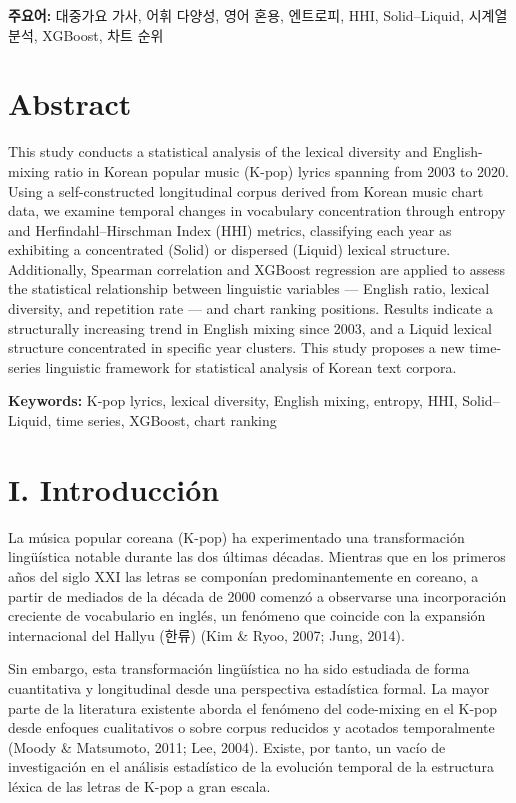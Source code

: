 \documentclass[11pt,a4paper]{article}
\begin{document}
\textbf{주요어:} 대중가요 가사, 어휘 다양성, 영어 혼용, 엔트로피, HHI,
Solid--Liquid, 시계열 분석, XGBoost, 차트 순위

\vspace{0.8em}

\section*{Abstract}

This study conducts a statistical analysis of the lexical diversity and
English-mixing ratio in Korean popular music (K-pop) lyrics spanning from
2003 to 2020.
Using a self-constructed longitudinal corpus derived from Korean music chart
data, we examine temporal changes in vocabulary concentration through
entropy and Herfindahl--Hirschman Index (HHI) metrics, classifying each year
as exhibiting a concentrated (Solid) or dispersed (Liquid) lexical structure.
Additionally, Spearman correlation and XGBoost regression are applied to assess
the statistical relationship between linguistic variables --- English ratio,
lexical diversity, and repetition rate --- and chart ranking positions.
Results indicate a structurally increasing trend in English mixing since 2003,
and a Liquid lexical structure concentrated in specific year clusters.
This study proposes a new time-series linguistic framework for statistical
analysis of Korean text corpora.

\textbf{Keywords:} K-pop lyrics, lexical diversity, English mixing, entropy,
HHI, Solid--Liquid, time series, XGBoost, chart ranking

\section*{I. Introducción}

La música popular coreana (K-pop) ha experimentado una transformación lingüística
notable durante las dos últimas décadas.
Mientras que en los primeros años del siglo XXI las letras se componían
predominantemente en coreano, a partir de mediados de la década de 2000 comenzó
a observarse una incorporación creciente de vocabulario en inglés, un fenómeno
que coincide con la expansión internacional del Hallyu (한류)
(Kim \& Ryoo, 2007; Jung, 2014).

Sin embargo, esta transformación lingüística no ha sido estudiada de forma
cuantitativa y longitudinal desde una perspectiva estadística formal.
La mayor parte de la literatura existente aborda el fenómeno del code-mixing
en el K-pop desde enfoques cualitativos o sobre corpus reducidos y acotados
temporalmente (Moody \& Matsumoto, 2011; Lee, 2004).
Existe, por tanto, un vacío de investigación en el análisis estadístico de la
evolución temporal de la estructura léxica de las letras de K-pop a gran escala.
\end{document}
